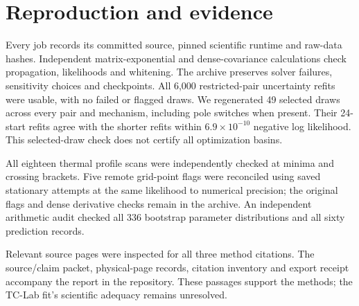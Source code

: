 \documentclass[10pt,letterpaper]{article}
\begin{document}
\section*{Reproduction and evidence}
Every job records its committed source, pinned scientific runtime and raw-data hashes. Independent matrix-exponential and dense-covariance calculations check propagation, likelihoods and whitening. The archive preserves solver failures, sensitivity choices and checkpoints.
All 6,000 restricted-pair uncertainty refits were usable, with no failed or flagged draws. We regenerated 49 selected draws across every pair and mechanism, including pole switches when present. Their 24-start refits agree with the shorter refits within $6.9\times10^{-10}$ negative log likelihood. This selected-draw check does not certify all optimization basins.

All eighteen thermal profile scans were independently checked at minima and crossing brackets. Five remote grid-point flags were reconciled using saved stationary attempts at the same likelihood to numerical precision; the original flags and dense derivative checks remain in the archive. An independent arithmetic audit checked all 336 bootstrap parameter distributions and all sixty prediction records.

Relevant source pages were inspected for all three method citations. The source/claim packet, physical-page records, citation inventory and export receipt accompany the report in the repository. These passages support the methods; the TC-Lab fit's scientific adequacy remains unresolved.

\clearpage


\end{document}
